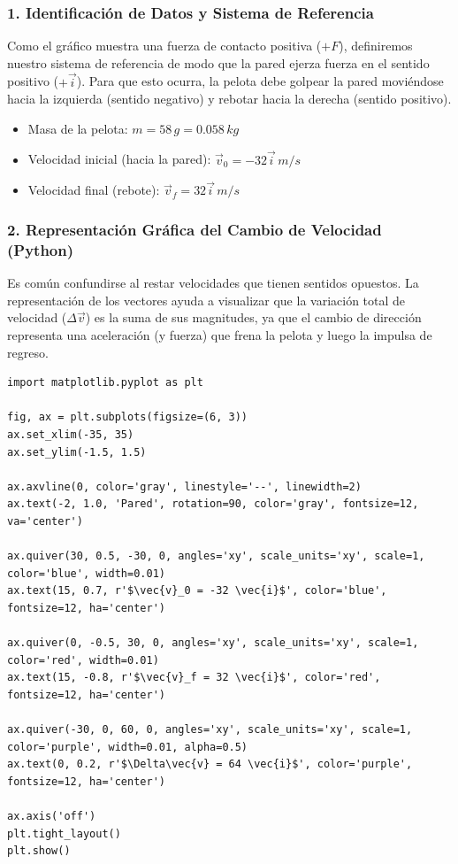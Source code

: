\documentclass[12pt, a4paper]{article}
\begin{document}
\subsubsection*{1. Identificación de Datos y Sistema de Referencia}
Como el gráfico muestra una fuerza de contacto positiva ($+F$), definiremos nuestro sistema de referencia de modo que la pared ejerza fuerza en el sentido positivo ($+\vec{i}$). Para que esto ocurra, la pelota debe golpear la pared moviéndose hacia la izquierda (sentido negativo) y rebotar hacia la derecha (sentido positivo).
\begin{itemize}
    \item Masa de la pelota: $m = 58 \, \si{g} = 0.058 \, \si{kg}$
    \item Velocidad inicial (hacia la pared): $\vec{v}_0 = -32 \vec{i} \, \si{m/s}$
    \item Velocidad final (rebote): $\vec{v}_f = 32 \vec{i} \, \si{m/s}$
\end{itemize}

\subsubsection*{2. Representación Gráfica del Cambio de Velocidad (Python)}
Es común confundirse al restar velocidades que tienen sentidos opuestos. La representación de los vectores ayuda a visualizar que la variación total de velocidad ($\Delta\vec{v}$) es la suma de sus magnitudes, ya que el cambio de dirección representa una aceleración (y fuerza) que frena la pelota y luego la impulsa de regreso.

\begin{lstlisting}
import matplotlib.pyplot as plt

fig, ax = plt.subplots(figsize=(6, 3))
ax.set_xlim(-35, 35)
ax.set_ylim(-1.5, 1.5)

ax.axvline(0, color='gray', linestyle='--', linewidth=2)
ax.text(-2, 1.0, 'Pared', rotation=90, color='gray', fontsize=12, va='center')

ax.quiver(30, 0.5, -30, 0, angles='xy', scale_units='xy', scale=1, color='blue', width=0.01)
ax.text(15, 0.7, r'$\vec{v}_0 = -32 \vec{i}$', color='blue', fontsize=12, ha='center')

ax.quiver(0, -0.5, 30, 0, angles='xy', scale_units='xy', scale=1, color='red', width=0.01)
ax.text(15, -0.8, r'$\vec{v}_f = 32 \vec{i}$', color='red', fontsize=12, ha='center')

ax.quiver(-30, 0, 60, 0, angles='xy', scale_units='xy', scale=1, color='purple', width=0.01, alpha=0.5)
ax.text(0, 0.2, r'$\Delta\vec{v} = 64 \vec{i}$', color='purple', fontsize=12, ha='center')

ax.axis('off')
plt.tight_layout()
plt.show()
\end{lstlisting}
\end{document}
